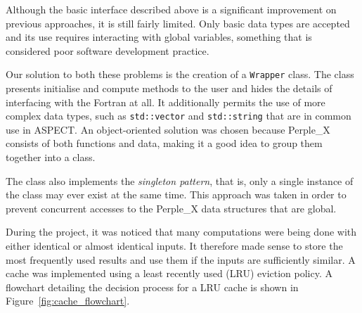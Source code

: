 Although the basic interface described above is a significant improvement on previous approaches, it is still fairly limited.
Only basic data types are accepted and its use requires interacting with global variables, something that is considered poor software development practice.

Our solution to both these problems is the creation of a \texttt{Wrapper} class.
The class presents initialise and compute methods to the user and hides the details of interfacing with the Fortran at all.
It additionally permits the use of more complex data types, such as \texttt{std::vector} and \texttt{std::string} that are in common use in ASPECT.
An object-oriented solution was chosen because Perple\_X consists of both functions and data, making it a good idea to group them together into a class.

The class also implements the \textit{singleton pattern}, that is, only a single instance of the class may ever exist at the same time.
This approach was taken in order to prevent concurrent accesses to the Perple\_X data structures that are global.

During the project, it was noticed that many computations were being done with either identical or almost identical inputs. 
It therefore made sense to store the most frequently used results and use them if the inputs are sufficiently similar.
A cache was implemented using a least recently used (LRU) eviction policy.
A flowchart detailing the decision process for a LRU cache is shown in Figure~\ref{fig:cache_flowchart}.

